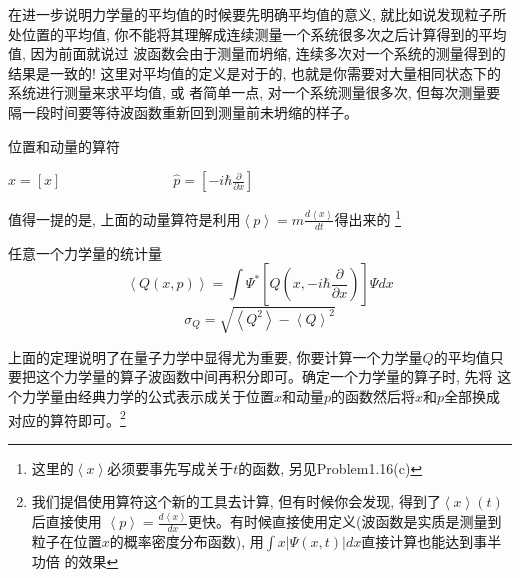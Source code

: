 \documentclass[a4paper,zihao=-4,linespread=1]{ctexrep}
\newenvironment{lequation}{\large\begin{equation}}{\end{equation}}
\begin{document}
    在进一步说明力学量的平均值的时候要先明确平均值的意义, 就比如说发现粒子所处位置的平均值, 你不能将其理解成连续测量一个系统很多次之后计算得到的平均值, 因为前面就说过
    波函数会由于测量而坍缩, 连续多次对一个系统的测量得到的结果是一致的! 这里对平均值的定义是对于的, 也就是你需要对大量相同状态下的系统进行测量来求平均值, 或
    者简单一点, 对一个系统测量很多次, 但每次测量要隔一段时间要等待波函数重新回到测量前未坍缩的样子。
    \begin{proposition}{位置和动量的算符}
        \begin{center}
            \begin{math}
                \displaystyle
                \hat{x}=[x] \qquad\qquad\qquad\qquad \hat{p}=\left[-i\hbar\frac{\partial}{\partial x}\right]    
            \end{math}
        \end{center}
        值得一提的是, 上面的动量算符是利用$\left \langle p \right \rangle=m\frac{d\left \langle x \right \rangle}{dt}$得出来的
        \footnote{这里的$\left \langle x \right \rangle$必须要事先写成关于$t$的函数, 另见Problem1.16(c)}
    \end{proposition}
    \begin{theorem}{任意一个力学量的统计量}
        \begin{lequation}
            \left \langle Q\left(x,p\right) \right \rangle=\int \Psi^{*}\left[Q\left(x,-i\hbar\frac{\partial}{\partial x}\right)\right]\Psi dx
        \end{lequation}
        \begin{equation}
            \sigma_Q = \sqrt{\left \langle Q^2 \right \rangle-\left \langle Q \right \rangle^2}
        \end{equation}
    \end{theorem}
    上面的定理说明了在量子力学中显得尤为重要, 你要计算一个力学量$Q$的平均值只要把这个力学量的算子波函数中间再积分即可。确定一个力学量的算子时, 先将
    这个力学量由经典力学的公式表示成关于位置$x$和动量$p$的函数然后将$x$和$p$全部换成对应的算符即可。\footnote{我们提倡使用算符这个新的工具去计算, 但有时候你会发现, 得到了$\left \langle x \right \rangle(t) $后直接使用
    $\left \langle p \right \rangle=\frac{d\left \langle x \right \rangle}{dx}$更快。有时候直接使用定义(波函数是实质是测量到粒子在位置$x$的概率密度分布函数), 用$\int x\left| \Psi(x,t)\right|dx$直接计算也能达到事半功倍
    的效果}
\end{document}
